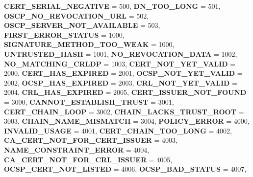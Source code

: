\begin{DoxyCompactItemize}
{\bfseries C\+E\+R\+T\+\_\+\+S\+E\+R\+I\+A\+L\+\_\+\+N\+E\+G\+A\+T\+I\+VE} = 500, 
\newline
{\bfseries D\+N\+\_\+\+T\+O\+O\+\_\+\+L\+O\+NG} = 501, 
{\bfseries O\+S\+C\+P\+\_\+\+N\+O\+\_\+\+R\+E\+V\+O\+C\+A\+T\+I\+O\+N\+\_\+\+U\+RL} = 502, 
{\bfseries O\+S\+C\+P\+\_\+\+S\+E\+R\+V\+E\+R\+\_\+\+N\+O\+T\+\_\+\+A\+V\+A\+I\+L\+A\+B\+LE} = 503, 
{\bfseries F\+I\+R\+S\+T\+\_\+\+E\+R\+R\+O\+R\+\_\+\+S\+T\+A\+T\+US} = 1000, 
\newline
{\bfseries S\+I\+G\+N\+A\+T\+U\+R\+E\+\_\+\+M\+E\+T\+H\+O\+D\+\_\+\+T\+O\+O\+\_\+\+W\+E\+AK} = 1000, 
{\bfseries U\+N\+T\+R\+U\+S\+T\+E\+D\+\_\+\+H\+A\+SH} = 1001, 
{\bfseries N\+O\+\_\+\+R\+E\+V\+O\+C\+A\+T\+I\+O\+N\+\_\+\+D\+A\+TA} = 1002, 
{\bfseries N\+O\+\_\+\+M\+A\+T\+C\+H\+I\+N\+G\+\_\+\+C\+R\+L\+DP} = 1003, 
\newline
{\bfseries C\+E\+R\+T\+\_\+\+N\+O\+T\+\_\+\+Y\+E\+T\+\_\+\+V\+A\+L\+ID} = 2000, 
{\bfseries C\+E\+R\+T\+\_\+\+H\+A\+S\+\_\+\+E\+X\+P\+I\+R\+ED} = 2001, 
{\bfseries O\+C\+S\+P\+\_\+\+N\+O\+T\+\_\+\+Y\+E\+T\+\_\+\+V\+A\+L\+ID} = 2002, 
{\bfseries O\+C\+S\+P\+\_\+\+H\+A\+S\+\_\+\+E\+X\+P\+I\+R\+ED} = 2003, 
\newline
{\bfseries C\+R\+L\+\_\+\+N\+O\+T\+\_\+\+Y\+E\+T\+\_\+\+V\+A\+L\+ID} = 2004, 
{\bfseries C\+R\+L\+\_\+\+H\+A\+S\+\_\+\+E\+X\+P\+I\+R\+ED} = 2005, 
{\bfseries C\+E\+R\+T\+\_\+\+I\+S\+S\+U\+E\+R\+\_\+\+N\+O\+T\+\_\+\+F\+O\+U\+ND} = 3000, 
{\bfseries C\+A\+N\+N\+O\+T\+\_\+\+E\+S\+T\+A\+B\+L\+I\+S\+H\+\_\+\+T\+R\+U\+ST} = 3001, 
\newline
{\bfseries C\+E\+R\+T\+\_\+\+C\+H\+A\+I\+N\+\_\+\+L\+O\+OP} = 3002, 
{\bfseries C\+H\+A\+I\+N\+\_\+\+L\+A\+C\+K\+S\+\_\+\+T\+R\+U\+S\+T\+\_\+\+R\+O\+OT} = 3003, 
{\bfseries C\+H\+A\+I\+N\+\_\+\+N\+A\+M\+E\+\_\+\+M\+I\+S\+M\+A\+T\+CH} = 3004, 
{\bfseries P\+O\+L\+I\+C\+Y\+\_\+\+E\+R\+R\+OR} = 4000, 
\newline
{\bfseries I\+N\+V\+A\+L\+I\+D\+\_\+\+U\+S\+A\+GE} = 4001, 
{\bfseries C\+E\+R\+T\+\_\+\+C\+H\+A\+I\+N\+\_\+\+T\+O\+O\+\_\+\+L\+O\+NG} = 4002, 
{\bfseries C\+A\+\_\+\+C\+E\+R\+T\+\_\+\+N\+O\+T\+\_\+\+F\+O\+R\+\_\+\+C\+E\+R\+T\+\_\+\+I\+S\+S\+U\+ER} = 4003, 
{\bfseries N\+A\+M\+E\+\_\+\+C\+O\+N\+S\+T\+R\+A\+I\+N\+T\+\_\+\+E\+R\+R\+OR} = 4004, 
\newline
{\bfseries C\+A\+\_\+\+C\+E\+R\+T\+\_\+\+N\+O\+T\+\_\+\+F\+O\+R\+\_\+\+C\+R\+L\+\_\+\+I\+S\+S\+U\+ER} = 4005, 
{\bfseries O\+C\+S\+P\+\_\+\+C\+E\+R\+T\+\_\+\+N\+O\+T\+\_\+\+L\+I\+S\+T\+ED} = 4006, 
{\bfseries O\+C\+S\+P\+\_\+\+B\+A\+D\+\_\+\+S\+T\+A\+T\+US} = 4007, 

\end{DoxyCompactItemize}

